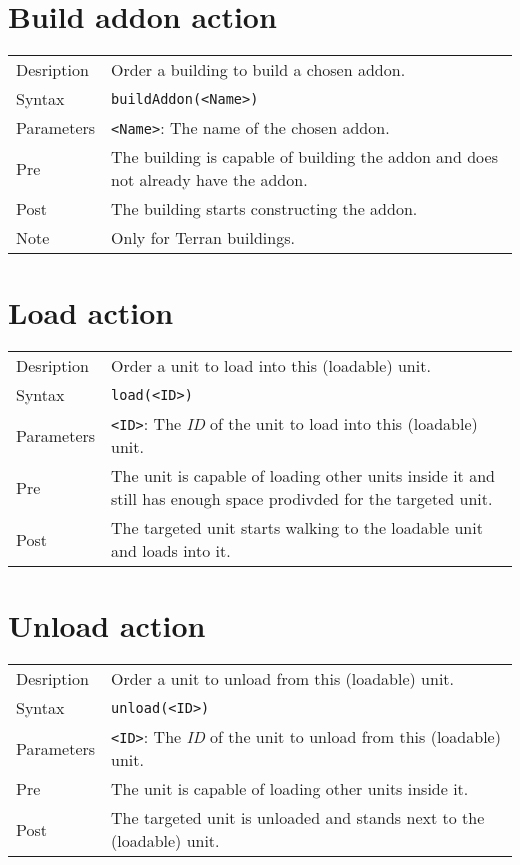 \section{Build addon action}
\begin{tabularx}{\textwidth}{lX}
 Desription & Order a building to build a chosen addon. \\
 Syntax & \verb|buildAddon(<Name>)| \\
 Parameters & \verb|<Name>|: The name of the chosen addon.\\
 Pre & The building is capable of building the addon and does not already have the addon. \\
 Post & The building starts constructing the addon. \\
 Note & Only for Terran buildings.
\end{tabularx}

\section{Load action}
\begin{tabularx}{\textwidth}{lX}
 Desription & Order a unit to load into this (loadable) unit. \\
 Syntax & \verb|load(<ID>)| \\
 Parameters & \verb|<ID>|: The \textit{ID} of the unit to load into this (loadable) unit.\\
 Pre & The unit is capable of loading other units inside it and still has enough space prodivded for the targeted unit. \\
 Post & The targeted unit starts walking to the loadable unit and loads into it.
\end{tabularx}

\section{Unload action}
\begin{tabularx}{\textwidth}{lX}
 Desription & Order a unit to unload from this (loadable) unit. \\
 Syntax & \verb|unload(<ID>)| \\
 Parameters & \verb|<ID>|: The \textit{ID} of the unit to unload from this (loadable) unit.\\
 Pre & The unit is capable of loading other units inside it. \\
 Post & The targeted unit is unloaded and stands next to the (loadable) unit.
\end{tabularx}

